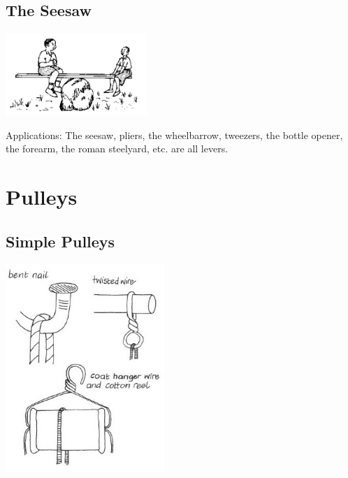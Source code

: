 \begin{multicols}{2}
\subsection{The Seesaw}

\begin{center}
\includegraphics[width=0.4\textwidth]{./img/source/mechanics.png}
\end{center}

\begin{description*}
\item[Applications:]{The seesaw, pliers, the wheelbarrow, tweezers, the bottle opener, the forearm, the roman
steelyard, etc. are all levers.}
\end{description*}

\columnbreak


\section*{Pulleys}


\subsection{Simple Pulleys}
\label{sub:pulleys}

\begin{center}
\includegraphics[width=0.45\textwidth]{./img/vso/pulleys.jpg}
\end{center}


\end{multicols}
